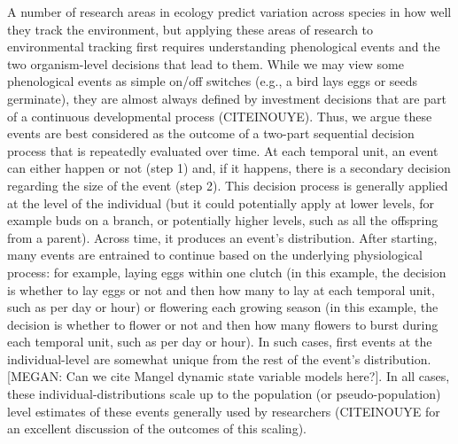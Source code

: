 \documentclass[11pt,letterpaper]{article}
\begin{document}
A number of research areas in ecology predict variation across species in how well they track the environment, but applying these areas of research to environmental tracking first requires understanding phenological events and the two organism-level decisions that lead to them. While we may view some phenological events as simple on/off switches (e.g., a bird lays eggs or seeds germinate), they are almost always defined by investment decisions that are part of a continuous developmental process (CITEINOUYE). Thus, we argue these events are best considered as the outcome of a two-part sequential decision process that is repeatedly evaluated over time. At each temporal unit, an event can either happen or not (step 1) and, if it happens, there is a secondary decision regarding the size of the event (step 2). This decision process is generally applied at the level of the individual (but it could potentially apply at lower levels, for example buds on a branch, or potentially higher levels, such as all the offspring from a parent). Across time, it produces an event's distribution. After starting, many events are entrained to continue based on the underlying physiological process: for example, laying eggs within one clutch (in this example, the decision is whether to lay eggs or not and then how many to lay at each temporal unit, such as per day or hour) or flowering each growing season (in this example, the decision is whether to flower or not and then how many flowers to burst during each temporal unit, such as per day or hour). In such cases, first events at the individual-level are somewhat unique from the rest of the event's distribution. [MEGAN: Can we cite Mangel dynamic state variable models here?]. In all cases, these individual-distributions scale up to the population (or pseudo-population) level estimates of these events generally used by researchers (CITEINOUYE for an excellent discussion of the outcomes of this scaling).
\end{document}
